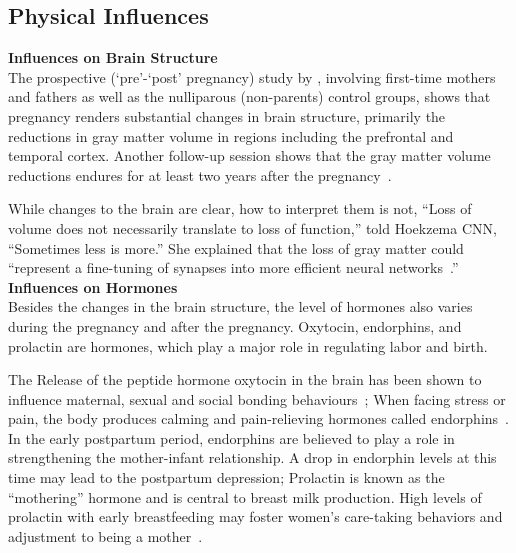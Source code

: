 \subsection{Physical Influences}\label{subsec.physicalinfluence}

\noindent\textbf{Influences on Brain Structure}\\
The prospective (`pre'-`post' pregnancy) study by \citeauthor{hoekzema2017pregnancy},
involving first-time mothers and fathers as well as the nulliparous (non-parents) control groups, shows that pregnancy renders substantial changes in brain structure, primarily the reductions in gray matter volume in regions including the prefrontal and temporal cortex. Another follow-up session shows that the gray matter volume reductions endures for at least two years after the pregnancy~\citep{hoekzema2017pregnancy}.
			
While changes to the brain are clear, how to interpret them is not, ``Loss of volume does not necessarily translate to loss of function,'' told Hoekzema CNN, ``Sometimes less is more.'' She explained that the loss of gray matter could ``represent a fine-tuning of synapses into more efficient neural networks~\citep{susanscutti2017}.''\\ %

\noindent\textbf{Influences on Hormones}\\
Besides the changes in the brain structure, the level of hormones also varies during the pregnancy and after the pregnancy. Oxytocin, endorphins, and prolactin are hormones, which play a major role in regulating labor and birth. 

The Release of the peptide hormone oxytocin in the brain has been shown to influence maternal, sexual and social bonding behaviours~\citep{yang2013nonsocial,chiras2013human,muehlenbein2010human}; When facing stress or pain, the body produces calming and pain-relieving hormones called endorphins~\citep{amir1980role}. In the early postpartum period, endorphins are believed to play a role in strengthening the mother-infant relationship. A drop in endorphin levels at this time may lead to the postpartum depression; Prolactin is known as the “mothering” hormone and is central to breast milk production. High levels of prolactin with early breastfeeding may foster women’s care-taking behaviors and adjustment to being a mother~\citep{lothian2005birth}.


